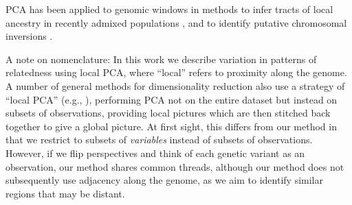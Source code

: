 \documentclass[11pt, oneside]{article}   	%
\newcommand\citet{\cite}
\newcommand\citep{\cite}
\begin{document}

PCA has been applied to genomic windows in methods to infer
tracts of local ancestry in recently admixed populations
\citep{bryc2010genomewide,brisbin2012pcadmix},
and to identify putative chromosomal inversions \citep{ma2012investigation}.

A note on nomenclature: In this work we describe variation in patterns of relatedness using local PCA,
where ``local'' refers to proximity along the genome.
A number of general methods for dimensionality reduction also use a strategy of ``local PCA''
(e.g., \citet{manjon2013diffusion,kambhatla1997dimension,weingessel2000local,roweis2000nonlinear}),
performing PCA not on the entire dataset but instead on subsets of observations,
providing local pictures which are then stitched back together to give a global picture.
At first sight,
this differs from our method in that we restrict to subsets of \emph{variables} instead of subsets of observations.
However, if we flip perspectives and think of each genetic variant as an observation,
our method shares common threads, although 
our method does not subsequently use adjacency along the genome,
as we aim to identify similar regions that may be distant.
\end{document}
